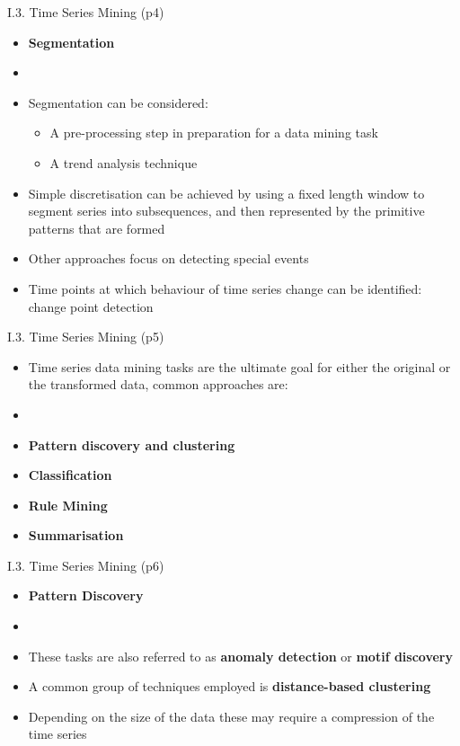 \documentclass[handout]{beamer}
\newcommand{\strong}[1]{\textbf{\color{teal} #1}}
\newcommand{\stronger}[1]{\textbf{\color{purple} #1}}
\begin{document}
\begin{frame}{I.3. Time Series Mining (p4)}
\begin{itemize}
\item[] \stronger{Segmentation}
\item[]
\item Segmentation can be considered:
	\begin{itemize}
	\item A pre-processing step in preparation for a data mining task
	\item A trend analysis technique
	\end{itemize}
\item Simple discretisation can be achieved by using a fixed length window to segment series into subsequences, and then represented by the primitive patterns that are formed
\item Other approaches focus on detecting special events
\item Time points at which behaviour of time series change can be identified: change point detection 
\end{itemize}
\end{frame}
\begin{frame}{I.3. Time Series Mining (p5)}
\begin{itemize}
\item[] Time series data mining tasks are the ultimate goal for either the original or the transformed data, common approaches are:
\item[]
\item \strong{Pattern discovery and clustering}
\item \strong{Classification}
\item \strong{Rule Mining}
\item \strong{Summarisation}
\end{itemize}
\end{frame}
\begin{frame}{I.3. Time Series Mining (p6)}
\begin{itemize}
\item[] \stronger{Pattern Discovery}
\item[]
\item These tasks are also referred to as \strong{anomaly detection} or \strong{motif discovery}
\item A common group of techniques employed is \strong{distance-based clustering}
\item Depending on the size of the data these may require a compression of the time series
\end{itemize}
\end{frame}
\end{document}
